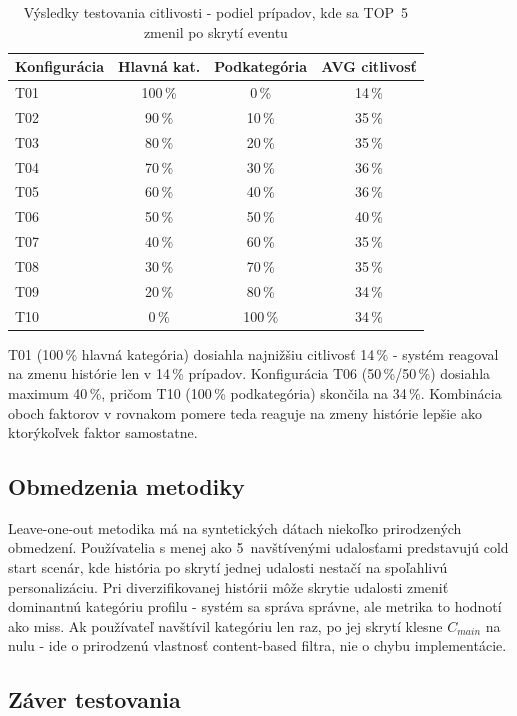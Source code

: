 \documentclass[12pt,a4paper]{article}
\begin{document}
\begin{table}[H]
\centering
\begin{tabular}{|l|c|c|c|}
\hline
\textbf{Konfigurácia} & \textbf{Hlavná kat.} & \textbf{Podkategória} & \textbf{AVG citlivosť} \\
\hline
T01 & 100\,\% & 0\,\%   & 14\,\% \\
T02 & 90\,\%  & 10\,\%  & 35\,\% \\
T03 & 80\,\%  & 20\,\%  & 35\,\% \\
T04 & 70\,\%  & 30\,\%  & 36\,\% \\
T05 & 60\,\%  & 40\,\%  & 36\,\% \\
T06 & 50\,\%  & 50\,\%  & 40\,\% \\
T07 & 40\,\%  & 60\,\%  & 35\,\% \\
T08 & 30\,\%  & 70\,\%  & 35\,\% \\
T09 & 20\,\%  & 80\,\%  & 34\,\% \\
T10 & 0\,\%   & 100\,\% & 34\,\% \\
\hline
\end{tabular}
\caption{Výsledky testovania citlivosti - podiel prípadov, kde sa TOP~5 zmenil po skrytí eventu}
\label{tab:sensitivity}
\end{table}

T01 (100\,\% hlavná kategória) dosiahla najnižšiu citlivosť 14\,\% - systém
reagoval na zmenu histórie len v 14\,\% prípadov. Konfigurácia T06 (50\,\%/50\,\%)
dosiahla maximum 40\,\%, pričom T10 (100\,\% podkategória) skončila na 34\,\%.
Kombinácia oboch faktorov v rovnakom pomere teda reaguje na zmeny histórie lepšie
ako ktorýkoľvek faktor samostatne.

\subsection{Obmedzenia metodiky}

Leave-one-out metodika má na syntetických dátach niekoľko prirodzených obmedzení.
Používatelia s menej ako 5~navštívenými udalosťami predstavujú cold start scenár,
kde história po skrytí jednej udalosti nestačí na spoľahlivú personalizáciu.
Pri diverzifikovanej histórii môže skrytie udalosti zmeniť dominantnú kategóriu
profilu - systém sa správa správne, ale metrika to hodnotí ako miss. Ak používateľ
navštívil kategóriu len raz, po jej skrytí klesne $C_{main}$ na nulu - ide o
prirodzenú vlastnosť content-based filtra, nie o chybu implementácie.

\subsection{Záver testovania}
\end{document}
